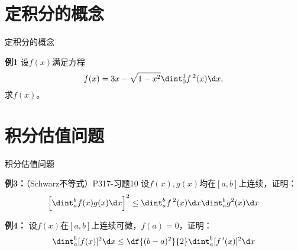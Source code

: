 \section{定积分的概念}

\begin{frame}{定积分的概念}
	\linespread{1.2}\pause 
	\begin{exampleblock}{{\bf 例1}\hfill }
		设$f(x)$满足方程
		$$f(x)=3x-\sqrt{1-x^2}\dint_0^1f\,^2(x)\d x,$$
		求$f(x)$。
	\end{exampleblock}
\end{frame}


\section{积分估值问题}


\begin{frame}{积分估值问题}
	\linespread{1.2}\pause 
	\begin{exampleblock}{{\bf 例3：}（Schwarz不等式）\hfill P317-习题10}
		设$f(x),g(x)$均在$[a,b]$上连续，证明：
		$$\left[\dint_a^bf(x)g(x)\d x\right]^2
		\leq\dint_a^bf\,^2(x)\d x\dint_a^bg^2(x)\d x$$
	\end{exampleblock}\pause 
	\begin{exampleblock}{{\bf 例4：}\hfill }
		设$f(x)$在$[a,b]$上连续可微，$f(a)=0$，证明：
		$$\dint_a^b[f(x)]^2\d x\leq\df{(b-a)^2}{2}\dint_a^b[f\,'(x)]^2\d x$$
	\end{exampleblock}
\end{frame}

